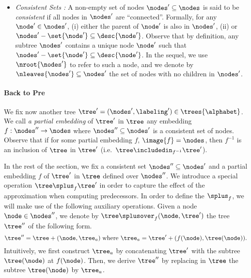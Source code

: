 \begin{itemize}
\item {\it Consistent Sets : } A non-empty set of 
nodes $\nodes'\subseteq\nodes$ is said to be \emph{consistent} if all nodes in $\nodes'$ 
are ``connected''.
%
Formally, for any $\node'\in\nodes'$, (i)  either the parent of $\node'$ is also in $\nodes'$, 
(ii) or $\nodes'-\set{\node'}\subseteq\desc{\node'}$.
%
Observe that by definition, any subtree $\nodes'$ contains a unique node $\node'$ such that 
$\nodes'-\set{\node'}\subseteq\desc{\node'}$.
%
In the sequel, we use $\nroot{\nodes'}$ to refer to such a node, and we denote by 
$\nleaves{\nodes'}\subseteq\nodes'$ the set of nodes with no children in $\nodes'$.
%
\end{itemize}
%

\paragraph{\bf Back to Pre}
%

We fix now another tree $\tree'=(\nodes',\labeling')\in\trees{\alphabet}$.
%
We call \emph{a partial embedding} of $\tree'$ in $\tree$ any embedding $f:\nodes''\to\nodes$ 
where $\nodes''\subseteq\nodes'$ is a consistent set of nodes.
%
Observe that if for some partial embedding $f$, $\image{f}=\nodes$, then $f^{-1}$ is 
an inclusion of $\tree$ in $\tree'$ (i.e.\ $\tree\includedin_{f^{-1}}\tree'$).
%

In the rest of the section, we fix a consistent set $\nodes''\subseteq\nodes'$ and 
a partial embedding $f$ of $\tree'$ in $\tree$ defined over $\nodes''$.
%
We introduce a special operation $\tree\splus_f\tree'$ in order to capture the effect of the 
approximation when computing predecessors.
%
In order to define the $\splus_f$, we will make use of the following auxiliary operations.
%
Given a node $\node\in\nodes''$, we denote by $\tree\splusover_f(\node,\tree')$ the tree $\tree''$ 
of the following form.
%
\[
\tree''=\tree+(\node,\tree_a)\;\text{where }
\tree_a=\tree'+(f(\node),\tree(\node))\text{.}
\]
%
Intuitively, we first construct $\tree_a$ by concatenating $\tree'$ with the subtree 
$\tree(\node)$ at $f(\node)$.
%
Then, we derive $\tree''$ by replacing in $\tree$ the subtree $\tree(\node)$ by $\tree_a$.
%

